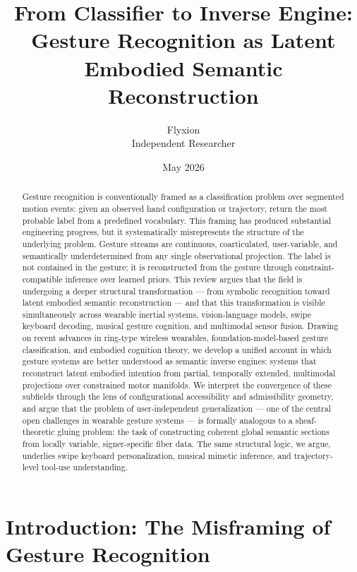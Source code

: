 \documentclass[11pt, a4paper]{article}
\title{\textbf{From Classifier to Inverse Engine:\\
\large Gesture Recognition as Latent Embodied Semantic Reconstruction}}
\author{Flyxion\\
\small Independent Researcher}
\date{May 2026}
\theoremstyle{definition}
\begin{document}
\maketitle

\begin{abstract}
Gesture recognition is conventionally framed as a classification problem over segmented motion events: given an observed hand configuration or trajectory, return the most probable label from a predefined vocabulary. This framing has produced substantial engineering progress, but it systematically misrepresents the structure of the underlying problem. Gesture streams are continuous, coarticulated, user-variable, and semantically underdetermined from any single observational projection. The label is not contained in the gesture; it is reconstructed from the gesture through constraint-compatible inference over learned priors. This review argues that the field is undergoing a deeper structural transformation --- from symbolic recognition toward latent embodied semantic reconstruction --- and that this transformation is visible simultaneously across wearable inertial systems, vision-language models, swipe keyboard decoding, musical gesture cognition, and multimodal sensor fusion. Drawing on recent advances in ring-type wireless wearables, foundation-model-based gesture classification, and embodied cognition theory, we develop a unified account in which gesture systems are better understood as semantic inverse engines: systems that reconstruct latent embodied intention from partial, temporally extended, multimodal projections over constrained motor manifolds. We interpret the convergence of these subfields through the lens of configurational accessibility and admissibility geometry, and argue that the problem of user-independent generalization --- one of the central open challenges in wearable gesture systems --- is formally analogous to a sheaf-theoretic gluing problem: the task of constructing coherent global semantic sections from locally variable, signer-specific fiber data. The same structural logic, we argue, underlies swipe keyboard personalization, musical mimetic inference, and trajectory-level tool-use understanding.
\end{abstract}

\newpage

\section{Introduction: The Misframing of Gesture Recognition}
\end{document}
